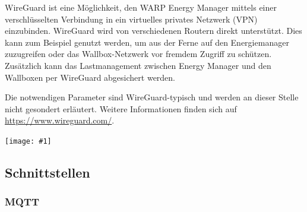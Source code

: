 \documentclass[a4paper,10pt]{article}
\newcommand{\gfx}[1]{\texttt{[image: \#1]}}
\begin{document}
\begin{multicols*}{2}
	WireGuard ist eine Möglichkeit, den WARP Energy Manager mittels einer verschlüsselten
	Verbindung in ein virtuelles privates Netzwerk (VPN) einzubinden. WireGuard wird von
	verschiedenen Routern direkt unterstützt. Dies kann zum Beispiel genutzt
	werden, um aus der Ferne auf den Energiemanager zuzugreifen oder das
	Wallbox-Netzwerk vor fremdem Zugriff zu schützen. Zusätzlich kann das
	Lastmanagement zwischen Energy Manager und den Wallboxen per WireGuard abgesichert werden.

	Die notwendigen Parameter sind WireGuard-typisch und werden an dieser Stelle
	nicht gesondert erläutert. Weitere Informationen finden sich auf
	\url{https://www.wireguard.com/}.

	\gfx{./img/resized/web_wireguard}

	\subsection{Schnittstellen}
	\subsubsection{MQTT}
	\label{mqtt-interface}
    

\end{multicols*}
\end{document}
